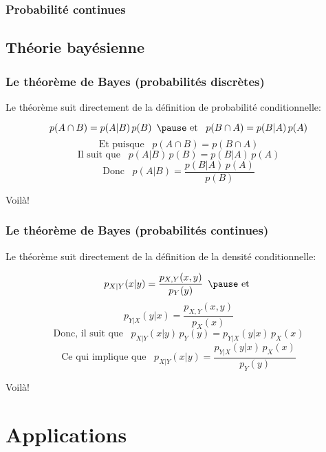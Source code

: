 \documentclass{beamer}
\begin{document}
\subsubsection{Probabilité continues}



\subsection{Théorie bayésienne}

\begin{frame}
    \frametitle{Le théorème de Bayes (probabilités discrètes)}
    Le théorème suit directement de la définition de probabilité conditionnelle:

    \pause

    \[p(A \cap B) =  p(A | B) \, p(B) \,\,\, \pause \textrm{ et } \,\,\, p(B \cap A) =  p(B | A) \, p(A)\]
    \pause
    \[\textrm{Et puisque } \,\,\, p(A \cap B) = p(B \cap A)\]
    \pause
    \[\textrm{Il suit que } \,\,\, p(A | B) \, p(B) = p(B | A) \, p(A)\]
    \pause
    \[\textrm{Donc } \,\,\, p(A | B) = \frac{p(B | A) \, p(A)}{p(B)}\]
    
    Voilà!
\end{frame}


\begin{frame}
    \frametitle{Le théorème de Bayes (probabilités continues)}
    Le théorème suit directement de la définition de la densité conditionnelle:

    \pause

    \[p_{X|Y}(x|y) = \frac{p_{X,Y}(x,y)}{p_Y(y)} \,\,\, \pause \textrm{ et }\]
    \[p_{Y|X}(y|x) = \frac{p_{X,Y}(x,y)}{p_X(x)}\]
    \pause
    \[\textrm{Donc, il suit que } \,\,\, p_{X|Y}(x|y) \, p_Y(y) = p_{Y|X}(y|x) \, p_X(x)\]
    \pause
    \[\textrm{Ce qui implique que } \,\,\, p_{X|Y}(x|y) = \frac{p_{Y|X}(y|x) \, p_X(x)}{p_Y(y)}\]

    Voilà!
\end{frame}



\section{Applications}
\end{document}
